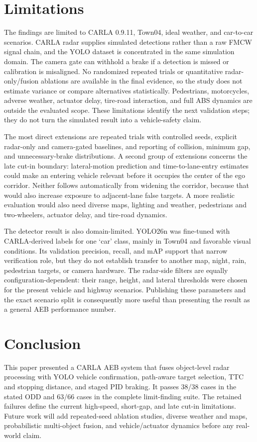 \documentclass[conference]{IEEEtran}
\begin{document}
\section{Limitations}
The findings are limited to CARLA 0.9.11, Town04, ideal weather, and car-to-car
scenarios. CARLA radar supplies simulated detections rather than a raw FMCW
signal chain, and the YOLO dataset is concentrated in the same simulation domain.
The camera gate can withhold a brake if a detection is missed or calibration is
misaligned. No randomized repeated trials or quantitative radar-only/fusion
ablations are available in the final evidence, so the study does not estimate
variance or compare alternatives statistically. Pedestrians, motorcycles,
adverse weather, actuator delay, tire-road interaction, and full ABS dynamics
are outside the evaluated scope. These limitations identify the next validation
steps; they do not turn the simulated result into a vehicle-safety claim.

The most direct extensions are repeated trials with controlled seeds, explicit
radar-only and camera-gated baselines, and reporting of collision, minimum gap,
and unnecessary-brake distributions. A second group of extensions concerns the
late cut-in boundary: lateral-motion prediction and time-to-lane-entry estimates
could make an entering vehicle relevant before it occupies the center of the
ego corridor. Neither follows automatically from widening the corridor, because
that would also increase exposure to adjacent-lane false targets. A more realistic
evaluation would also need diverse maps, lighting and weather, pedestrians and
two-wheelers, actuator delay, and tire-road dynamics.

The detector result is also domain-limited. YOLO26n was fine-tuned with
CARLA-derived labels for one `car' class, mainly in Town04 and favorable visual
conditions. Its validation precision, recall, and mAP support that narrow
verification role, but they do not establish transfer to another map, night,
rain, pedestrian targets, or camera hardware. The radar-side filters are equally
configuration-dependent: their range, height, and lateral thresholds were chosen
for the present vehicle and highway scenarios. Publishing these parameters and
the exact scenario split is consequently more useful than presenting the result
as a general AEB performance number.

\section{Conclusion}
This paper presented a CARLA AEB system that fuses object-level radar processing
with YOLO vehicle confirmation, path-aware target selection, TTC and stopping
distance, and staged PID braking. It passes 38/38 cases in the stated ODD and
63/66 cases in the complete limit-finding suite. The retained failures define
the current high-speed, short-gap, and late cut-in limitations. Future work will
add repeated-seed ablation studies, diverse weather and maps, probabilistic
multi-object fusion, and vehicle/actuator dynamics before any real-world claim.

\balance


\end{document}
